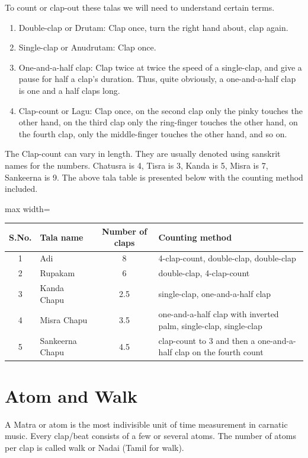 To count or clap-out these talas we will need to understand certain terms.
\begin{enumerate}
  \item Double-clap or Drutam: Clap once, turn the right hand about, clap again.
  \item Single-clap or Anudrutam: Clap once.
  \item One-and-a-half clap: Clap twice at twice the speed of a single-clap, and give
    a pause for half a clap's duration. Thus, quite obviously, a one-and-a-half clap
    is one and a half claps long.
  \item Clap-count or Lagu: Clap once, on the second clap only the pinky touches the
    other hand, on the third clap only the ring-finger touches the other hand, on the
    fourth clap, only the middle-finger touches the other hand, and so on.
\end{enumerate}

The Clap-count can vary in length. They are usually denoted using sanskrit names for
the numbers. Chatusra is 4, Tisra is 3, Kanda is 5, Misra is 7, Sankeerna is 9. The
above tala table is presented below with the counting method included.

\begin{center}
\begin{adjustbox}{max width=\textwidth}
\begin{tabular}{c l c p{6.2cm}}
\toprule
S.No. & Tala name & Number of claps & Counting method\\
\midrule
1 & Adi             & 8   & 4-clap-count, double-clap, double-clap\\
2 & Rupakam         & 6   & double-clap, 4-clap-count\\
3 & Kanda Chapu     & 2.5 & single-clap, one-and-a-half clap\\
4 & Misra Chapu     & 3.5 & one-and-a-half clap with inverted palm, single-clap, single-clap\\
5 & Sankeerna Chapu & 4.5 & clap-count to 3 and then a one-and-a-half clap on the fourth count\\
\bottomrule
\end{tabular}
\end{adjustbox}
\end{center}

\section{Atom and Walk}

A Matra or atom is the most indivisible unit of time measurement in carnatic music.
Every clap/beat consists of a few or several atoms. The number of atoms per clap is
called walk or Nadai (Tamil for walk).

